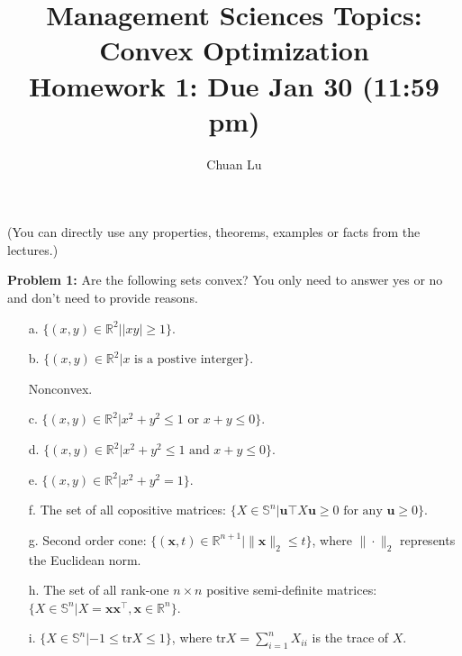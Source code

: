 \documentclass{article}
\newcommand{\bx}{{\mathbf x}}
\newcommand{\bu}{{\mathbf u}}
\begin{document}
\title{Management Sciences Topics: Convex Optimization\\ Homework 1: Due Jan 30 (11:59 pm) }
\author{Chuan Lu}
\date{}

\maketitle
\noindent(You can directly use any properties, theorems, examples or facts from the lectures.)
\bigskip

\noindent\textbf{Problem 1:} Are the following sets convex? You only need to answer yes or no and don't need to provide reasons.
\begin{enumerate}
	\item[a.] $\{(x,y)\in\mathbb{R}^2||xy|\geq 1\}$.



	\item[b.] $\{(x,y)\in\mathbb{R}^2|x\text{ is a postive interger}\}$.

	Nonconvex.

	\item[c.] $\{(x,y)\in\mathbb{R}^2|x^2+y^2\leq1\text{ or }x+y\leq 0\}$.



	\item[d.] $\{(x,y)\in\mathbb{R}^2|x^2+y^2\leq1\text{ and }x+y\leq 0\}$.
	\item[e.] $\{(x,y)\in\mathbb{R}^2|x^2+y^2=1\}$.
	\item[f.] The set of all copositive matrices:  $\{X\in\mathbb{S}^n|\bu\top X\bu\geq0 \text{ for any }\bu\geq0\}$.
	\item[g.] Second order cone:  $\{(\bx,t)\in\mathbb{R}^{n+1}|\|\bx\|_2\leq t\}$, where $\|\cdot\|_2$ represents the Euclidean norm.
	\item[h.] The set of all rank-one $n\times n$ positive semi-definite matrices: $\{X\in\mathbb{S}^n|X=\bx\bx^{\top},\bx\in\mathbb{R}^n\}$.
	\item[i.] $\{X\in\mathbb{S}^n|-1\leq\text{tr}{X}\leq 1\}$, where $\text{tr}{X}=\sum_{i=1}^{n}X_{ii}$ is the trace of $X$.
\end{enumerate}
\bigskip
\end{document}

